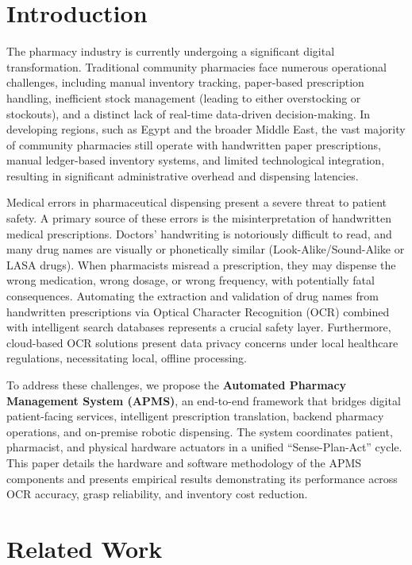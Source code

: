 \documentclass[conference]{IEEEtran}
\begin{document}
\section{Introduction}
The pharmacy industry is currently undergoing a significant digital transformation. Traditional community pharmacies face numerous operational challenges, including manual inventory tracking, paper-based prescription handling, inefficient stock management (leading to either overstocking or stockouts), and a distinct lack of real-time data-driven decision-making. In developing regions, such as Egypt and the broader Middle East, the vast majority of community pharmacies still operate with handwritten paper prescriptions, manual ledger-based inventory systems, and limited technological integration, resulting in significant administrative overhead and dispensing latencies.

Medical errors in pharmaceutical dispensing present a severe threat to patient safety. A primary source of these errors is the misinterpretation of handwritten medical prescriptions. Doctors' handwriting is notoriously difficult to read, and many drug names are visually or phonetically similar (Look-Alike/Sound-Alike or LASA drugs). When pharmacists misread a prescription, they may dispense the wrong medication, wrong dosage, or wrong frequency, with potentially fatal consequences. Automating the extraction and validation of drug names from handwritten prescriptions via Optical Character Recognition (OCR) combined with intelligent search databases represents a crucial safety layer. Furthermore, cloud-based OCR solutions present data privacy concerns under local healthcare regulations, necessitating local, offline processing.

To address these challenges, we propose the \textbf{Automated Pharmacy Management System (APMS)}, an end-to-end framework that bridges digital patient-facing services, intelligent prescription translation, backend pharmacy operations, and on-premise robotic dispensing. The system coordinates patient, pharmacist, and physical hardware actuators in a unified ``Sense-Plan-Act'' cycle. This paper details the hardware and software methodology of the APMS components and presents empirical results demonstrating its performance across OCR accuracy, grasp reliability, and inventory cost reduction.

\section{Related Work}
\end{document}
